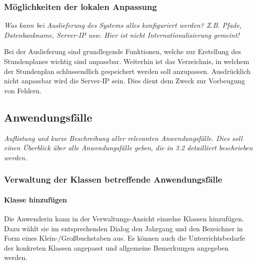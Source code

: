 \documentclass[fontsize=12pt,paper=a4,twoside]{scrartcl}
\begin{document}
\subsubsection{Möglichkeiten der lokalen Anpassung}


  {\em Was kann bei Auslieferung des Systems alles konfiguriert
  werden? Z.B. Pfade, Datenbankname, Server-IP usw. Hier ist nicht
  Internationalisierung gemeint!}

Bei der Auslieferung sind grundlegende Funktionen, welche zur Erstellung des Stundenplanes wichtig sind anpassbar.
Weiterhin ist das Verzeichnis, in welchem der Stundenplan schlussendlich gespeichert werden soll anzupassen.
Ausdrücklich nicht anpassbar wird die Server-IP sein.
Dies dient dem Zweck zur Vorbeugung von Fehlern.


\subsection{Anwendungsfälle}
  {\em Auflistung und kurze Beschreibung aller relevanten
  Anwendungsfälle. Dies soll einen Überblick über alle Anwendungsfälle
  geben, die in 3.2 detailliert beschrieben werden.}
  
\subsubsection{Verwaltung der Klassen betreffende Anwendungsfälle}


\paragraph{Klasse hinzufügen} Die Anwenderin kann in der Verwaltungs-Ansicht einzelne Klassen hinzufügen. Dazu wählt sie im entsprechenden Dialog den Jahrgang und den Bezeichner in Form eines Klein-/Großbuchstaben aus. Es können auch die Unterrichtsbedarfe der konkreten Klassen angepasst und allgemeine Bemerkungen angegeben werden.
\end{document}
